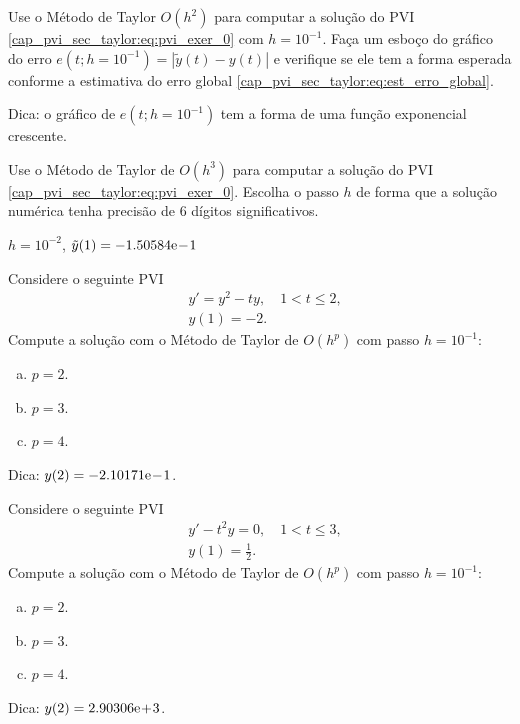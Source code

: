 \begin{exer}
  Use o Método de Taylor $O(h^2)$ para computar a solução do PVI \eqref{cap_pvi_sec_taylor:eq:pvi_exer_0} com $h=10^{-1}$. Faça um esboço do gráfico do erro $e\left(t; h=10^{-1}\right) = \left|\tilde{y}(t) - y(t)\right|$ e verifique se ele tem a forma esperada conforme a estimativa do erro global \eqref{cap_pvi_sec_taylor:eq:est_erro_global}.
\end{exer}
\begin{resp}
  Dica: o gráfico de $e\left(t; h=10^{-1}\right)$ tem a forma de uma função exponencial crescente.
\end{resp}

\begin{exer}
  Use o Método de Taylor de $O(h^3)$ para computar a solução do PVI \eqref{cap_pvi_sec_taylor:eq:pvi_exer_0}. Escolha o passo $h$ de forma que a solução numérica tenha precisão de 6 dígitos significativos.
\end{exer}
\begin{resp}
  $h=10^{-2}$, $\tilde{y}(1) = -1.50584\mathrm{e}\!-\!1$
\end{resp}

\begin{exer}
  Considere o seguinte PVI
  \begin{subequations}
    \begin{align}
      &y' = y^2 - ty,\quad 1 < t \leq 2,\\
      &y(1) = -2.
    \end{align}
  \end{subequations}
  Compute a solução com o Método de Taylor de $O\left(h^p\right)$ com passo $h = 10^{-1}$:
  \begin{enumerate}[a)]
  \item $p = 2$.
  \item $p = 3$.
  \item $p = 4$.
  \end{enumerate}
\end{exer}
\begin{resp}
  Dica: $y(2) = -2.10171\mathrm{e}\!-\!1$.
\end{resp}

\begin{exer}
  Considere o seguinte PVI
  \begin{subequations}
    \begin{align}
      &y' - t^2y = 0,\quad 1 < t \leq 3,\\
      &y(1) = \frac{1}{2}.
    \end{align}
  \end{subequations}
  Compute a solução com o Método de Taylor de $O\left(h^p\right)$ com passo $h = 10^{-1}$:
  \begin{enumerate}[a)]
  \item $p = 2$.
  \item $p = 3$.
  \item $p = 4$.
  \end{enumerate}
\end{exer}
\begin{resp}
  Dica: $y(2) = 2.90306\mathrm{e}\!+\!3$.
\end{resp}


